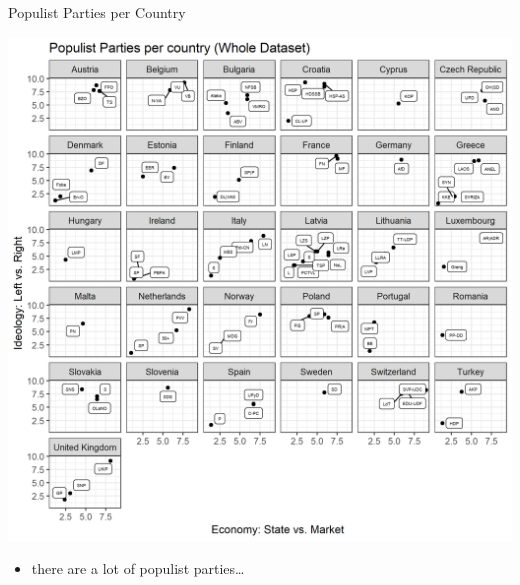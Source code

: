 \documentclass[
  ignorenonframetext,
]{beamer}
\providecommand{\tightlist}{%
  \setlength{\itemsep}{0pt}\setlength{\parskip}{0pt}}
\begin{document}
\begin{frame}{Populist Parties per Country}
\protect\hypertarget{populist-parties-per-country}{}

\begin{center}\includegraphics[width=1\linewidth]{PNG/party_per_country} \end{center}

\begin{itemize}
\tightlist
\item
  there are a lot of populist parties\ldots{}
\end{itemize}

\end{frame}
\end{document}
